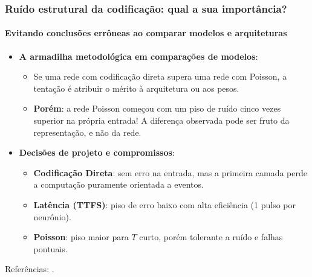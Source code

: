 \begin{frame}
	\frametitle{Ruído estrutural da codificação: qual a sua importância?}
	\framesubtitle{Evitando conclusões errôneas ao comparar modelos e arquiteturas}
	\small
	\begin{itemize}
		\setlength{\itemsep}{2pt}
		\item \textbf{A armadilha metodológica em comparações de modelos}:
		\begin{itemize}
			\item Se uma rede com codificação direta supera uma rede com Poisson, a tentação é atribuir o mérito à arquitetura ou aos pesos.
			\item \textbf{Porém}: a rede Poisson começou com um piso de ruído cinco vezes superior na própria entrada! A diferença observada pode ser fruto da representação, e não da rede.
		\end{itemize}
		\item \textbf{Decisões de projeto e compromissos}:
		\begin{itemize}
			\item \textbf{Codificação Direta}: sem erro na entrada, mas a primeira camada perde a computação puramente orientada a eventos.
			\item \textbf{Latência (TTFS)}: piso de erro baixo com alta eficiência (1 pulso por neurônio).
			\item \textbf{Poisson}: piso maior para $T$ curto, porém tolerante a ruído e falhas pontuais.
		\end{itemize}
	\end{itemize}
	\par\vfill{\tiny Referências: \cite{eshraghian2023training, liu2023firstspike}.}
\end{frame}
